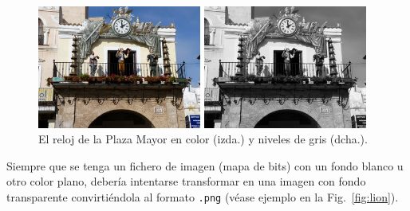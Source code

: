 \documentclass[11pt,a4paper]{article}
\begin{document}
\begin{figure}[hbt]
	\centering
		\includegraphics[width=0.97\textwidth]{2clockCR}
		\caption[Varias imágenes como una]{El reloj de la Plaza Mayor en color (izda.) y niveles de gris (dcha.).}
	\label{fig:2clock}
\end{figure}

Siempre que se tenga un fichero de imagen (mapa de bits) con un fondo blanco u otro color plano, debería intentarse transformar en una imagen con fondo transparente convirtiéndola al formato \texttt{.png} (véase ejemplo en la Fig.~\ref{fig:lion}).
\end{document}
